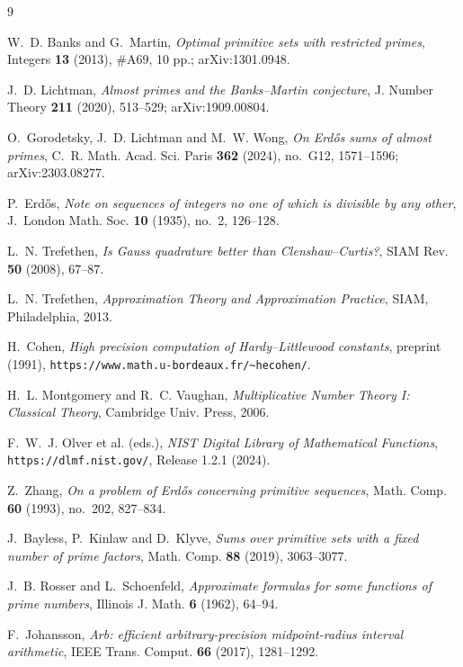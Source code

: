 \documentclass[11pt]{amsart}
\theoremstyle{plain}
\theoremstyle{definition}
\begin{document}
\begin{thebibliography}{9}

W.~D. Banks and G.~Martin,
\emph{Optimal primitive sets with restricted primes},
Integers \textbf{13} (2013), \#A69, 10 pp.; arXiv:1301.0948.

J.~D. Lichtman,
\emph{Almost primes and the Banks--Martin conjecture},
J. Number Theory \textbf{211} (2020), 513--529;
arXiv:1909.00804.

O.~Gorodetsky, J.~D. Lichtman and M.~W. Wong,
\emph{On Erd\H{o}s sums of almost primes},
C.~R. Math. Acad. Sci. Paris \textbf{362} (2024), no.~G12, 1571--1596;
\mbox{arXiv:2303.08277}.

P.~Erd\H{o}s,
\emph{Note on sequences of integers no one of which is divisible by any
other},
J.~London Math. Soc. \textbf{10} (1935), no.~2, 126--128.

L.~N. Trefethen,
\emph{Is Gauss quadrature better than Clenshaw--Curtis?},
SIAM Rev. \textbf{50} (2008), 67--87.

L.~N. Trefethen,
\emph{Approximation Theory and Approximation Practice},
SIAM, Philadelphia, 2013.

H.~Cohen,
\emph{High precision computation of Hardy--Littlewood constants},
preprint (1991),
\texttt{https://www.math.u-bordeaux.fr/\textasciitilde hecohen/}.

H.~L. Montgomery and R.~C. Vaughan,
\emph{Multiplicative Number Theory I: Classical Theory},
Cambridge Univ. Press, 2006.

F.~W.~J. Olver et al. (eds.),
\emph{NIST Digital Library of Mathematical Functions},
\texttt{https://dlmf.nist.gov/}, Release 1.2.1 (2024).

Z.~Zhang,
\emph{On a problem of Erd\H{o}s concerning primitive sequences},
Math. Comp. \textbf{60} (1993), no.~202, 827--834.

J.~Bayless, P.~Kinlaw and D.~Klyve,
\emph{Sums over primitive sets with a fixed number of prime factors},
Math. Comp. \textbf{88} (2019), 3063--3077.

J.~B. Rosser and L.~Schoenfeld,
\emph{Approximate formulas for some functions of prime numbers},
Illinois J. Math. \textbf{6} (1962), 64--94.

F.~Johansson,
\emph{Arb: efficient arbitrary-precision midpoint-radius interval
arithmetic},
IEEE Trans. Comput. \textbf{66} (2017), 1281--1292.

\end{thebibliography}
\end{document}
